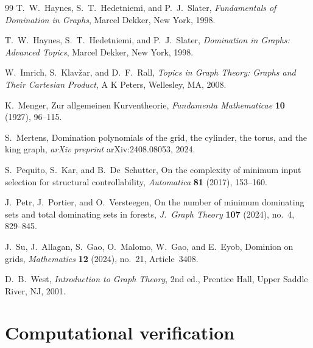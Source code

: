 \documentclass[11pt]{article}
\theoremstyle{plain}
\theoremstyle{definition}
\theoremstyle{remark}
\begin{document}
\begin{thebibliography}{99}
T.~W.~Haynes, S.~T.~Hedetniemi, and P.~J.~Slater,
\emph{Fundamentals of Domination in Graphs},
Marcel Dekker, New York, 1998.

T.~W.~Haynes, S.~T.~Hedetniemi, and P.~J.~Slater,
\emph{Domination in Graphs: Advanced Topics},
Marcel Dekker, New York, 1998.

W.~Imrich, S.~Klav{\v{z}}ar, and D.~F.~Rall,
\emph{Topics in Graph Theory: Graphs and Their Cartesian Product},
A K Peters, Wellesley, MA, 2008.

K.~Menger,
Zur allgemeinen Kurventheorie,
\emph{Fundamenta Mathematicae} \textbf{10} (1927), 96--115.

S.~Mertens,
Domination polynomials of the grid, the cylinder, the torus, and the king graph,
\emph{arXiv preprint} arXiv:2408.08053, 2024.

S.~Pequito, S.~Kar, and B.~De~Schutter,
On the complexity of minimum input selection for structural controllability,
\emph{Automatica} \textbf{81} (2017), 153--160.

J.~Petr, J.~Portier, and O.~Versteegen,
On the number of minimum dominating sets and total dominating sets in forests,
\emph{J.\ Graph Theory} \textbf{107} (2024), no.~4, 829--845.

J.~Su, J.~Allagan, S.~Gao, O.~Malomo, W.~Gao, and E.~Eyob,
Dominion on grids,
\emph{Mathematics} \textbf{12} (2024), no.~21, Article~3408.

D.~B.~West,
\emph{Introduction to Graph Theory}, 2nd ed.,
Prentice Hall, Upper Saddle River, NJ, 2001.

\end{thebibliography}



\newpage
\appendix

\section{Computational verification}\label{app:computation}
\end{document}
